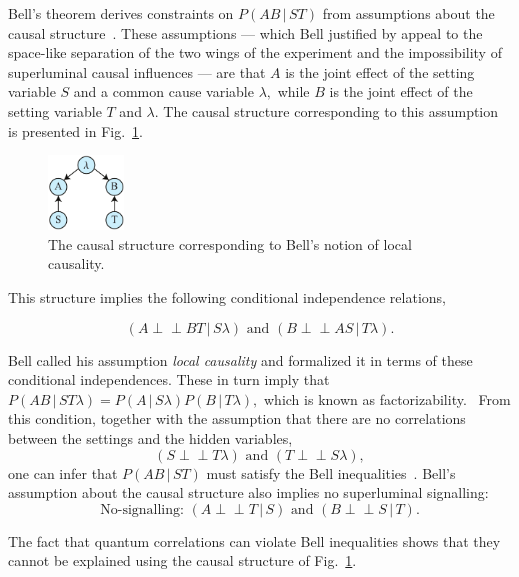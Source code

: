 \documentclass[12pt,onecolumn,nofootinbib]{revtex4-2}
\def\indep{\perp\!\!\!\!\perp}
\begin{document}
Bell's theorem derives constraints
on $P(AB\,|\,ST)$ from assumptions about the causal structure~\cite{Bell1964}.  These assumptions --- which Bell justified by appeal to the space-like separation of the two wings of the experiment and the impossibility of superluminal causal influences --- are that $A$ is the joint effect of the setting variable $S$ and a common cause variable
$\lambda ,$ while $B$ is the joint effect of the setting variable $T$ and $\lambda .$ The causal structure corresponding to this assumption is presented in Fig.~\ref{fig:localcausality}.

\begin{figure}[h]
	\centering
	\includegraphics[width=0.18\textwidth]{localcausality}
 \caption{The causal structure corresponding to Bell's notion of local causality.
 }
       \label{fig:localcausality}
\end{figure}

This structure implies the following conditional independence relations,

\begin{equation*}
(A\indep BT\,|\,S\lambda) \text{ and }(B\indep AS\,|\,T\lambda).
\end{equation*}

Bell called his assumption \emph{local causality} and formalized it in terms
of these conditional independences.  These in turn imply that $
P(AB\,|\,ST\lambda )=P(A\,|\,S\lambda )P(B\,|\,T\lambda ),$ which is known as
factorizability. \ From this condition, together with the assumption that
there are no correlations between the settings and the hidden variables,%
\begin{equation*}
(S\indep T\lambda) \text{ and } (T\indep S\lambda) ,
\end{equation*}
one can infer that $P(AB\,|\,ST)$ must satisfy the Bell
inequalities~\cite{Bell1964,CHSH1969}. Bell's assumption about the causal structure also implies no superluminal signalling:
\begin{equation}\label{eq:nosignalling}
\text{No-signalling: } (A\indep T\,|\,S)\text{ and }(B\indep S\,|\,T).
\end{equation}

The fact that quantum correlations can violate Bell inequalities shows that they cannot be explained using the causal structure of Fig.~\ref{fig:localcausality}.
\end{document}
